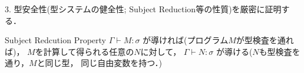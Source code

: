 \documentclass[dvipdfmx,cjk,xcolor=dvipsnames,envcountsect,notheorems,12pt]{beamer}
\theoremstyle{definition}
\begin{document}
\begin{appendix}
\begin{frame}[fragile]
  3. 型安全性(型システムの健全性; Subject Reduction等の性質)を厳密に証明する．

  \begin{block}{Subject Redcution Property}
    $\Gamma \vdash M: \sigma$ が導ければ(プログラム$M$が型検査を通れば)，
    $M$を計算して得られる任意の$N$に対して，
    $\Gamma \vdash N: \sigma$ が導ける($N$も型検査を通り，$M$と同じ型，
    同じ自由変数を持つ．)
  \end{block}

\end{frame}




\end{appendix}
\end{document}
